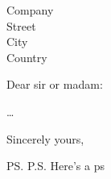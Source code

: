 \documentclass{letter}
\begin{document}
\begin{letter}{Company \\ Street \\ City \\ Country}
  \opening{Dear sir or madam:}
  \dots
  \closing{Sincerely yours,}
  \ps{P.S. Here's a ps}
\end{letter}
\end{document}

